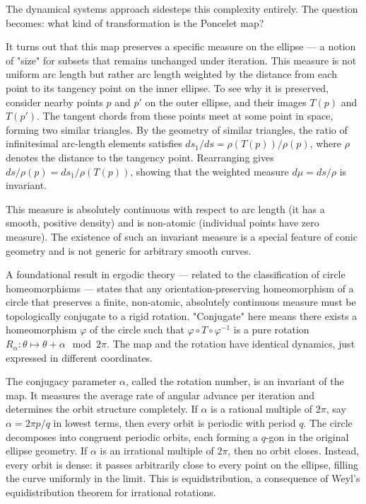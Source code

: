 The dynamical systems approach sidesteps this complexity entirely. The question becomes: what kind of transformation is the Poncelet map?

It turns out that this map preserves a specific measure on the ellipse — a notion of "size" for subsets that remains unchanged under iteration. This measure is not uniform arc length but rather arc length weighted by the distance from each point to its tangency point on the inner ellipse. To see why it is preserved, consider nearby points $p$ and $p'$ on the outer ellipse, and their images $T(p)$ and $T(p')$. The tangent chords from these points meet at some point in space, forming two similar triangles. By the geometry of similar triangles, the ratio of infinitesimal arc-length elements satisfies $d s_1 / d s = \rho(T(p)) / \rho(p)$, where $\rho$ denotes the distance to the tangency point. Rearranging gives $d s / \rho(p) = d s_1 / \rho(T(p))$, showing that the weighted measure $d\mu = ds/\rho$ is invariant.

This measure is absolutely continuous with respect to arc length (it has a smooth, positive density) and is non-atomic (individual points have zero measure). The existence of such an invariant measure is a special feature of conic geometry and is not generic for arbitrary smooth curves.

A foundational result in ergodic theory — related to the classification of circle homeomorphisms — states that any orientation-preserving homeomorphism of a circle that preserves a finite, non-atomic, absolutely continuous measure must be topologically conjugate to a rigid rotation. "Conjugate" here means there exists a homeomorphism $\varphi$ of the circle such that $\varphi \circ T \circ \varphi^{-1}$ is a pure rotation $R_\alpha: \theta \mapsto \theta + \alpha \mod 2\pi$. The map and the rotation have identical dynamics, just expressed in different coordinates.

The conjugacy parameter $\alpha$, called the rotation number, is an invariant of the map. It measures the average rate of angular advance per iteration and determines the orbit structure completely. If $\alpha$ is a rational multiple of $2\pi$, say $\alpha = 2\pi p/q$ in lowest terms, then every orbit is periodic with period $q$. The circle decomposes into congruent periodic orbits, each forming a $q$-gon in the original ellipse geometry. If $\alpha$ is an irrational multiple of $2\pi$, then no orbit closes. Instead, every orbit is dense: it passes arbitrarily close to every point on the ellipse, filling the curve uniformly in the limit. This is equidistribution, a consequence of Weyl's equidistribution theorem for irrational rotations.


